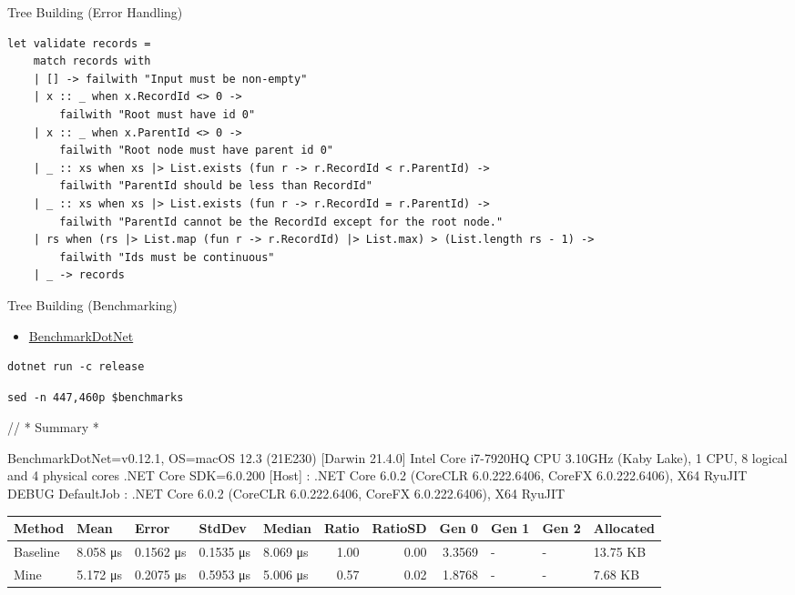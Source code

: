 \documentclass[t]{beamer}
\begin{document}
\begin{frame}[label={sec:org4876361},fragile]{Tree Building (Error Handling)}
 \begin{verbatim}
let validate records =
    match records with
    | [] -> failwith "Input must be non-empty"
    | x :: _ when x.RecordId <> 0 -> 
        failwith "Root must have id 0"
    | x :: _ when x.ParentId <> 0 -> 
        failwith "Root node must have parent id 0"
    | _ :: xs when xs |> List.exists (fun r -> r.RecordId < r.ParentId) -> 
        failwith "ParentId should be less than RecordId"
    | _ :: xs when xs |> List.exists (fun r -> r.RecordId = r.ParentId) -> 
        failwith "ParentId cannot be the RecordId except for the root node."
    | rs when (rs |> List.map (fun r -> r.RecordId) |> List.max) > (List.length rs - 1) -> 
        failwith "Ids must be continuous"
    | _ -> records
\end{verbatim}
\end{frame}

\begin{frame}[label={sec:orga0da274},fragile]{Tree Building (Benchmarking)}
 \begin{itemize}
\item \href{https://github.com/dotnet/BenchmarkDotNet}{BenchmarkDotNet}
\end{itemize}

\begin{verbatim}
dotnet run -c release
\end{verbatim}

\begin{verbatim}
sed -n 447,460p $benchmarks
\end{verbatim}

\tiny
// * Summary *

BenchmarkDotNet=v0.12.1, OS=macOS 12.3 (21E230) [Darwin 21.4.0]
Intel Core i7-7920HQ CPU 3.10GHz (Kaby Lake), 1 CPU, 8 logical and 4 physical cores
.NET Core SDK=6.0.200
  [Host]     : .NET Core 6.0.2 (CoreCLR 6.0.222.6406, CoreFX 6.0.222.6406), X64 RyuJIT DEBUG
  DefaultJob : .NET Core 6.0.2 (CoreCLR 6.0.222.6406, CoreFX 6.0.222.6406), X64 RyuJIT


\begin{center}
\begin{tabular}{lllllrrrlll}
Method & Mean & Error & StdDev & Median & Ratio & RatioSD & Gen 0 & Gen 1 & Gen 2 & Allocated\\
\hline
Baseline & 8.058 μs & 0.1562 μs & 0.1535 μs & 8.069 μs & 1.00 & 0.00 & 3.3569 & - & - & 13.75 KB\\
Mine & 5.172 μs & 0.2075 μs & 0.5953 μs & 5.006 μs & 0.57 & 0.02 & 1.8768 & - & - & 7.68 KB\\
\end{tabular}
\end{center}
\end{frame}
\end{document}
